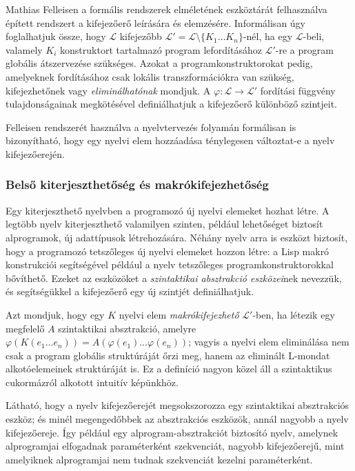 Mathias Felleisen a formális rendszerek elméletének eszköztárát felhasználva épített rendszert a kifejezőerő leírására és elemzésére\cite{Felleisen90}.
Informálisan úgy foglalhatjuk össze, hogy $\mathcal{L}$ kifejezőbb $\mathcal{L}' = \mathcal{L} \setminus \{K_1 \ldots K_n\}$-nél, ha egy $\mathcal{L}$-beli, valamely $K_i$ konstruktort tartalmazó program lefordításához $\mathcal{L}'$-re a program globális átszervezése szükséges.
Azokat a programkonstruktorokat pedig, amelyeknek fordításához csak lokális transzformációkra van szükség, kifejezhetőnek vagy \textit{eliminálhatónak} mondjuk.
A $\varphi: \mathcal{L} \rightarrow \mathcal{L}'$ fordítási függvény tulajdonságainak megkötésével definiálhatjuk a kifejezőerő különböző szintjeit. %

Felleisen rendszerét használva a nyelvtervezés folyamán formálisan is bizonyítható, hogy egy nyelvi elem hozzáadása ténylegesen változtat-e a nyelv kifejezőerején.


\subsubsection{Belső kiterjeszthetőség és makrókifejezhetőség}
Egy kiterjeszthető nyelvben a programozó új nyelvi elemeket hozhat létre.
A legtöbb nyelv kiterjeszthető valamilyen szinten, például lehetőséget biztosít alprogramok, új adattípusok létrehozására.
Néhány nyelv arra is eszközt biztosít, hogy a programozó tetszőleges új nyelvi elemeket hozzon létre: a Lisp makró konstrukciói segítségével például a nyelv tetszőleges programkonstruktorokkal bővíthető.
Ezeket az eszközöket a \textit{szintaktikai absztrakció eszközei}nek nevezzük, és segítségükkel a kifejezőerő egy új szintjét definiálhatjuk.

Azt mondjuk, hogy egy $K$ nyelvi elem \textit{makrókifejezhető} $\mathcal{L}'$-ben, ha létezik egy megfelelő $A$ szintaktikai absztrakció, amelyre
$\varphi (K(e_1 \ldots e_n) ) = A(\varphi(e_1) \ldots \varphi(e_n))$; vagyis a nyelvi elem eliminálása nem csak a program globális struktúráját őrzi meg, hanem az eliminált L-mondat alkotóelemeinek struktúráját is\cite[3.11~definíció]{Felleisen90}. Ez a definíció nagyon közel áll a szintaktikus cukormázról alkotott intuitív képünkhöz.

Látható, hogy a nyelv kifejezőerejét megsokszorozza egy szintaktikai absztrakciós eszköz; és minél megengedőbbek az absztrakciós eszközök, annál nagyobb a nyelv kifejezőereje. Így például egy alprogram-absztrakciót biztosító nyelv, amelynek alprogramjai elfogadnak paraméterként szekvenciát, nagyobb kifejezőerejű, mint amelyiknek alprogramjai nem tudnak szekvenciát kezelni paraméterként. %


